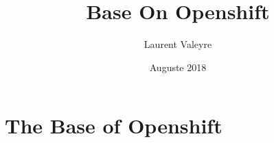 \documentclass[12pt, letterpaper]{article}
\title{Base On Openshift}
\author{Laurent Valeyre}
\date{Auguste 2018}
\begin{document}
\maketitle
\tableofcontents

\section{The Base of Openshift}



\listoffigures
\end{document}
